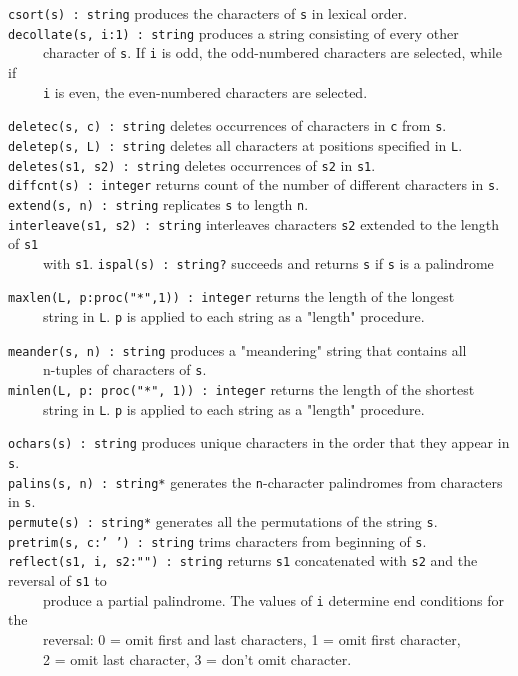 \texttt{csort(s) : string} produces the characters of \texttt{s} in
lexical order.\\
\texttt{decollate(s, i:1) : string} produces a string consisting of
every other\\
 \ \ \ \ \ character of \texttt{s}. If \texttt{i} is odd, the
odd-numbered characters are selected, while if\\
 \ \ \ \ \ \texttt{i} is even, the even-numbered characters are selected.

\texttt{deletec(s, c) : string} deletes occurrences of characters in
\texttt{c} from \texttt{s}.\\
\texttt{deletep(s, L) : string} deletes all characters at positions
specified in \texttt{L}.\\
\texttt{deletes(s1, s2) : string} deletes occurrences of \texttt{s2} in
\texttt{s1}.\\
\texttt{diffcnt(s) : integer} returns count of the number of different
characters in \texttt{s}.\\
\texttt{extend(s, n) : string} replicates \texttt{s} to length
\texttt{n}.\\
\texttt{interleave(s1, s2) : string} interleaves characters \texttt{s2}
extended to the length of \texttt{s1}\\
 \ \ \ \ \  with \texttt{s1}.
\texttt{ispal(s) : string?} succeeds and returns \texttt{s} if
\texttt{s} is a palindrome

\texttt{maxlen(L, p:proc("*",1)) : integer}
returns the length of the longest\\
 \ \ \ \ \ string in \texttt{L}. \texttt{p} is applied to each string as
a "length" procedure.

\texttt{meander(s, n) : string} produces a
"meandering" string that contains
all\\
 \ \ \ \ \ n-tuples of characters of \texttt{s}.\\
\texttt{minlen(L, p: proc("*", 1)) :
integer} returns the length of the shortest\\
 \ \ \ \ \ string in \texttt{L}. \texttt{p} is applied to each string as
a "length" procedure.

\texttt{ochars(s) : string} produces unique characters in the order that
they appear in \texttt{s}.\\
\texttt{palins(s, n) : string*} generates the \texttt{n}{}-character
palindromes from characters in \texttt{s}.\\
\texttt{permute(s) : string*} generates all the permutations of the
string \texttt{s}.\\
\texttt{pretrim(s, c:' ') : string}
trims characters from beginning of \texttt{s}.\\
\texttt{reflect(s1, i, s2:"") : string}
returns \texttt{s1} concatenated with \texttt{s2} and the reversal of \texttt{s1} to\\
 \ \ \ \ \ produce a partial palindrome. The
values of \texttt{i} determine end conditions for the\\
 \ \ \ \ \ reversal: 0 = omit first
and last characters, 1 = omit first character,\\
 \ \ \ \ \ 2 = omit last character, 3 =
don't omit character.

